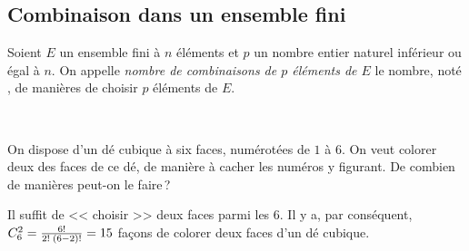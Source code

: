 				\subsection{Combinaison dans un ensemble fini}
					\begin{defi}
						Soient $E$ un ensemble fini \`a $n$ \'el\'ements et $p$ un nombre entier naturel inf\'erieur ou \'egal \`a $n$.
						On appelle \emph{nombre de combinaisons de $p$ \'el\'ements de $E$} le nombre, not\'e 
						,
							de mani\`eres de choisir $p$ \'el\'ements de $E$.
					\end{defi}
                  	\begin{prop}~\\[-1\baselineskip]
								\propbox{
									\[
										\Comb{n}{p} = \frac{n!}{p!\;(n-p)!}
									\]
								}
 						\end{prop}
 					\begin{ex}
	 						On dispose d'un d\'e cubique \`a six faces, num\'erot\'ees de $1$ \`a $6$.
 						On veut colorer deux des faces de ce d\'e, de mani\`ere \`a cacher les num\'eros y figurant.
 						De combien de mani\`eres peut-on le faire\,?
 						\begin{valiny}
	 						Il suffit de << choisir >> deux faces parmi les 6.
 							Il y a, par cons\'equent, 
 							$C_{6}^{2} = \frac{6!}{2! \; (6-2)!} = 15$ fa\c{c}ons de colorer deux faces d'un d\'e cubique.
 						\end{valiny}
 					\end{ex}
%
